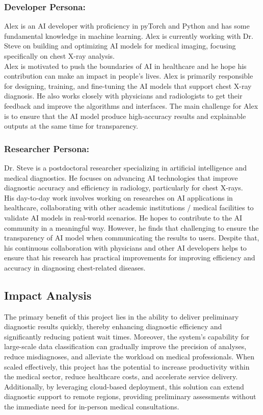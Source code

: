 \documentclass[12pt]{article}
\begin{document}
\subsubsection{Developer Persona:}
Alex is an AI developer with proficiency in pyTorch and Python and has some fundamental knowledge in machine learning. Alex is currently working with Dr. Steve on building and optimizing AI models for medical imaging, focusing specifically on chest X-ray analysis.\\
\newline
Alex is motivated to push the boundaries of AI in healthcare and he hope his contribution can make an impact in people's lives. Alex is primarily responsible for designing, training, and fine-tuning the AI models that support chest X-ray diagnosis. He also works closely with physicians and radiologists to get their feedback and improve the algorithms and interfaces. The main challenge for Alex is to ensure that the AI model produce high-accuracy results and explainable outputs at the same time for transparency.

\subsubsection{Researcher Persona:}
Dr. Steve is a postdoctoral researcher specializing in artificial intelligence and medical diagnostics. He focuses on advancing AI technologies that improve diagnostic accuracy and efficiency in radiology, particularly for chest X-rays.\\
\newline
His day-to-day work involves working on researches on AI applications in healthcare, collaborating with other academic institutions / medical facilities  to validate AI models in real-world scenarios. He hopes to contribute to the AI community in a meaningful way. However, he finds that challenging to ensure the transparency of AI model when communicating the results to users. Despite that, his continuous collaboration with physicians and other AI developers helps to ensure that his research has practical improvements for improving efficiency and accuracy in diagnosing chest-related diseases.

\subsection{Impact Analysis}

The primary benefit of this project lies in the ability to deliver preliminary diagnostic results quickly, thereby enhancing diagnostic efficiency and significantly reducing patient wait times. Moreover, the system's capability for large-scale data classification can gradually improve the precision of analyses, reduce misdiagnoses, and alleviate the workload on medical professionals. When scaled effectively, this project has the potential to increase productivity within the medical sector, reduce healthcare costs, and accelerate service delivery. Additionally, by leveraging cloud-based deployment, this solution can extend diagnostic support to remote regions, providing preliminary assessments without the immediate need for in-person medical consultations.
\end{document}
